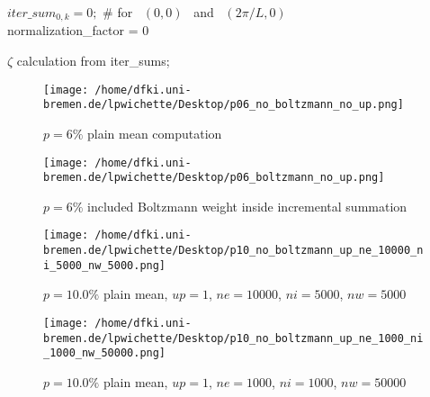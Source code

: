 \documentclass{article}
\begin{document}
\begin{algorithm}

$iter\_sum_{0, k} = 0;$ \qquad \# for~ $(0, 0)$ ~and~ $(2\pi/L, 0)$\\
normalization\_factor = 0\;

$\zeta$ calculation from iter\_sums;\

\end{algorithm}

\begin{figure}[h!]
  \centering
  \texttt{[image: /home/dfki.uni-bremen.de/lpwichette/Desktop/p06\_no\_boltzmann\_no\_up.png]}
  \caption{$p=6\%$ plain mean computation}
\end{figure}

\begin{figure}[h!]
  \centering
  \texttt{[image: /home/dfki.uni-bremen.de/lpwichette/Desktop/p06\_boltzmann\_no\_up.png]}
  \caption{$p=6\%$ included Boltzmann weight inside incremental summation}
\end{figure}

\begin{figure}[h!]
  \centering
  \texttt{[image: /home/dfki.uni-bremen.de/lpwichette/Desktop/p10\_no\_boltzmann\_up\_ne\_10000\_ni\_5000\_nw\_5000.png]}
  \caption{$p=10.0\%$ plain mean, $up=1$, $ne=10000$, $ni=5000$, $nw=5000$}
\end{figure}

\begin{figure}[h!]
  \centering
  \texttt{[image: /home/dfki.uni-bremen.de/lpwichette/Desktop/p10\_no\_boltzmann\_up\_ne\_1000\_ni\_1000\_nw\_50000.png]}
  \caption{$p=10.0\%$ plain mean, $up=1$, $ne=1000$, $ni=1000$, $nw=50000$}
\end{figure}
\end{document}
